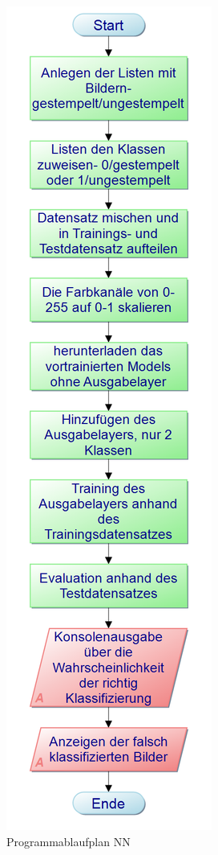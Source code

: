 \documentclass[12pt,toc=bib,toc=listof]{scrreprt}
\begin{document}
\begin{figure}[h]
\begin{minipage}[t]{.24\linewidth}
  \includegraphics[width=\linewidth]{./../bilder/Mobilenet}
  \caption{Programmablaufplan NN}
  \label{fig:nn_pap}
\end{minipage}
\end{figure}
\end{document}

